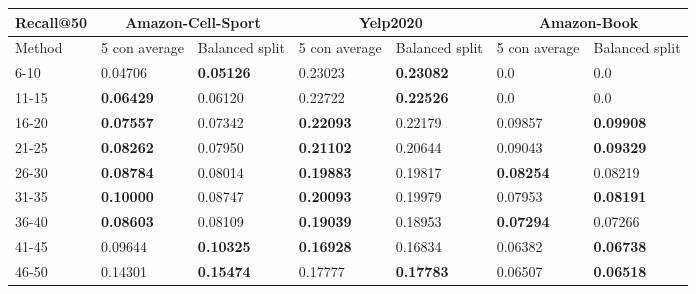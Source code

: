 \begin{table*}[h!]
    \centering
    \begin{tabular}{|l|l|l||l|l||l|l|}
        \hline
        Recall@50 & \multicolumn{2}{c||}{Amazon-Cell-Sport} & \multicolumn{2}{c||}{Yelp2020} & \multicolumn{2}{c|}{Amazon-Book}                                                          \\ \hline
        Method    & 5 con average                           & Balanced split                 & 5 con average                    & Balanced split   & 5 con average    & Balanced split   \\ \hline
        6-10      & 0.04706                                 & \textbf{0.05126}               & 0.23023                          & \textbf{0.23082} & 0.0              & 0.0              \\ \hline
        11-15     & \textbf{0.06429}                        & 0.06120                        & 0.22722                          & \textbf{0.22526} & 0.0              & 0.0              \\ \hline
        16-20     & \textbf{0.07557}                        & 0.07342                        & \textbf{0.22093}                 & 0.22179          & 0.09857          & \textbf{0.09908} \\ \hline
        21-25     & \textbf{0.08262}                        & 0.07950                        & \textbf{0.21102}                 & 0.20644          & 0.09043          & \textbf{0.09329} \\ \hline
        26-30     & \textbf{0.08784}                        & 0.08014                        & \textbf{0.19883}                 & 0.19817          & \textbf{0.08254} & 0.08219          \\ \hline
        31-35     & \textbf{0.10000}                        & 0.08747                        & \textbf{0.20093}                 & 0.19979          & 0.07953          & \textbf{0.08191} \\ \hline
        36-40     & \textbf{0.08603}                        & 0.08109                        & \textbf{0.19039}                 & 0.18953          & \textbf{0.07294} & 0.07266          \\ \hline
        41-45     & 0.09644                                 & \textbf{0.10325}               & \textbf{0.16928}                 & 0.16834          & 0.06382          & \textbf{0.06738} \\ \hline
        46-50     & 0.14301                                 & \textbf{0.15474}               & 0.17777                          & \textbf{0.17783} & 0.06507          & \textbf{0.06518} \\ \hline

\end{tabular}
\end{table*}
